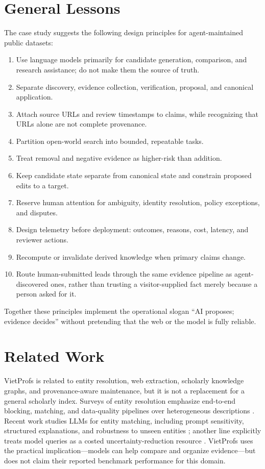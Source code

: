 \documentclass[11pt]{article}
\begin{document}
\section{General Lessons}
The case study suggests the following design principles for agent-maintained public datasets:
\begin{enumerate}
\item Use language models primarily for candidate generation, comparison, and research assistance;
  do not make them the source of truth.
\item Separate discovery, evidence collection, verification, proposal, and canonical application.
\item Attach source URLs and review timestamps to claims, while recognizing that URLs alone are not
  complete provenance.
\item Partition open-world search into bounded, repeatable tasks.
\item Treat removal and negative evidence as higher-risk than addition.
\item Keep candidate state separate from canonical state and constrain proposed edits to a target.
\item Reserve human attention for ambiguity, identity resolution, policy exceptions, and disputes.
\item Design telemetry before deployment: outcomes, reasons, cost, latency, and reviewer actions.
\item Recompute or invalidate derived knowledge when primary claims change.
\item Route human-submitted leads through the same evidence pipeline as agent-discovered ones, rather
  than trusting a visitor-supplied fact merely because a person asked for it.
\end{enumerate}
Together these principles implement the operational slogan ``AI proposes; evidence decides'' without pretending that the web or the model is fully reliable.

\section{Related Work}
VietProfs is related to entity resolution, web extraction, scholarly knowledge graphs, and provenance-aware maintenance, but it is not a replacement for a general scholarly index.
Surveys of entity resolution emphasize end-to-end blocking, matching, and data-quality pipelines over heterogeneous descriptions \cite{christophides2019er,elmagarmid2007duplicate}.
Recent work studies LLMs for entity matching, including prompt sensitivity, structured explanations, and robustness to unseen entities \cite{peeters2023llm}; another line explicitly treats model queries as a costed uncertainty-reduction resource \cite{li2024er}.
VietProfs uses the practical implication---models can help compare and organize evidence---but does not claim their reported benchmark performance for this domain.
\end{document}
